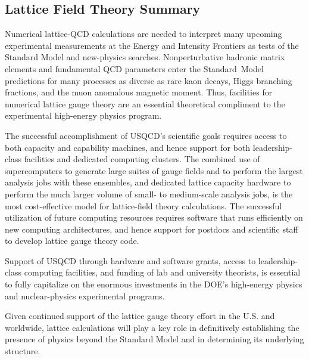 \subsection{Lattice Field Theory Summary}


Numerical lattice-QCD calculations are needed to interpret many upcoming
experimental measurements at the Energy and Intensity Frontiers as tests of
the Standard Model and new-physics searches.  Nonperturbative hadronic matrix
elements and fundamental QCD parameters enter the Standard~Model predictions
for many processes as diverse as rare kaon decays, Higgs branching fractions,
and the muon anomalous magnetic moment.  Thus, facilities for numerical
lattice gauge theory are an essential theoretical compliment to the
experimental high-energy physics program.

The successful accomplishment of USQCD's scientific goals requires
access to both capacity and capability machines, and hence support for both
leadership-class facilities and dedicated computing clusters.  The combined
use of supercomputers to generate large suites of gauge fields and to perform
the largest analysis jobs with these ensembles, and dedicated lattice capacity
hardware to perform the much larger volume of small- to medium-scale analysis
jobs, is the most cost-effective model for lattice-field theory calculations.
The successful utilization of future computing resources requires software
that runs efficiently on new computing architectures, and hence support for
postdocs and scientific staff to develop lattice gauge theory code.

Support of USQCD through hardware and software grants, access to
leadership-class computing facilities, and funding of lab and university
theorists, is essential to fully capitalize on the enormous investments in the
DOE's high-energy physics and nuclear-physics experimental programs.

Given continued support of the lattice gauge theory effort in the U.S. and
worldwide, lattice calculations will play a key role in definitively
establishing the presence of physics beyond the Standard Model and in
determining its underlying structure.
